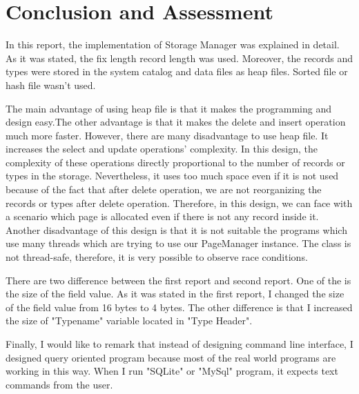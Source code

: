 \documentclass[12pt]{article}
\begin{document}
\section{Conclusion and Assessment}
In this report, the implementation of Storage Manager was explained in detail. As it was stated, the fix length record length was used. Moreover, the records and types were stored in the system catalog and data files as heap files. Sorted file or hash file wasn't used. 

The main advantage of using heap file is that it makes the programming and design easy.The other advantage is that it makes the delete and insert operation much more faster. However, there are many disadvantage to use heap file. It increases the select and update operations' complexity. In this design, the complexity of these operations directly proportional to the number of records or types in the storage. Nevertheless, it uses too much space even if it is not used because of the fact that after delete operation, we are not reorganizing the records or types after delete operation. Therefore, in this design, we can face with a scenario which page is allocated even if there is not any record inside it. Another disadvantage of this design is that it is not suitable the programs which use many threads which are trying to use our PageManager instance. The class is not thread-safe, therefore, it is very possible to observe race conditions.

There are two difference between the first report and second report. One of the is the size of the field value. As it was stated in the first report, I changed the size of the field value from 16 bytes to 4 bytes. The other difference is that I increased the size of "Typename" variable located in "Type Header". 

Finally, I would like to remark that instead of designing command line interface, I designed query oriented program because most of the real world programs are working in this way. When I run "SQLite" or "MySql" program, it expects text commands from the user. 
\end{document}
